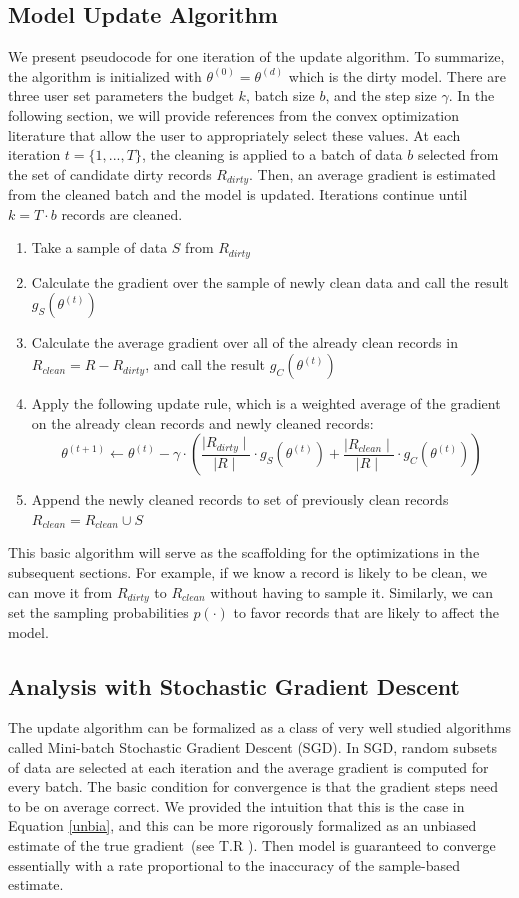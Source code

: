 \subsection{Model Update Algorithm}\label{update-alg}
We present pseudocode for one iteration of the update algorithm.
To summarize, the algorithm is initialized with $\theta^{(0)} = \theta^{(d)}$ which is the dirty model.
There are three user set parameters the budget $k$, batch size $b$, and the step size $\gamma$.
In the following section, we will provide references from the convex optimization literature that allow the user to appropriately select these values.
At each iteration $t=\{1,...,T\}$, the cleaning is applied to a batch of data $b$ selected from the set of candidate dirty records $R_{dirty}$.
Then, an average gradient is estimated from the cleaned batch and the model is updated.
Iterations continue until $k = T \cdot b$ records are cleaned.

\begin{enumerate}[noitemsep]
	\item Take a sample of data $S$ from $R_{dirty}$ 
	\item Calculate the gradient over the sample of newly clean data and call the result $g_S(\theta^{(t)})$
	\item Calculate the average gradient over all of the already clean records in $R_{clean}=R-R_{dirty}$, and call the result $g_C(\theta^{(t)})$
	\item Apply the following update rule, which is a weighted average of the gradient on the already clean records and newly cleaned records:
	\[
	\theta^{(t+1)} \leftarrow \theta^{(t)} - \gamma \cdot(\frac{\mid R_{dirty} \mid}{\mid R \mid} \cdot g_S(\theta^{(t)}) + \frac{\mid R_{clean} \mid}{\mid R \mid} \cdot  g_C(\theta^{(t)}))
	\]
	\item Append the newly cleaned records to set of previously clean records $R_{clean} = R_{clean} \cup S$ 
\end{enumerate} 

This basic algorithm will serve as the scaffolding for the optimizations in the subsequent sections.
For example, if we know a record is likely to be clean, we can move it from $R_{dirty}$ to $R_{clean}$ without having to sample it.
Similarly, we can set the sampling probabilities $p(\cdot)$ to favor records that are likely to affect the model.

\subsection{Analysis with Stochastic Gradient Descent}\label{sgd}
The update algorithm can be formalized as a class of very well studied algorithms called Mini-batch Stochastic Gradient Descent (SGD).
In SGD, random subsets of data are selected at each iteration and the average gradient is computed for every batch.
The basic condition for convergence is that the gradient steps need to be on average correct.
We provided the intuition that this is the case in Equation \ref{unbia}, and this can be more rigorously formalized as an unbiased estimate of the true gradient~(see T.R \cite{activecleanarxiv}).
Then model is guaranteed to converge essentially with a rate proportional to the inaccuracy of the sample-based estimate.

